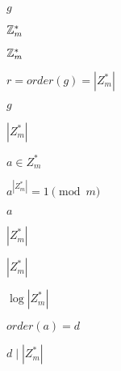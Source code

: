 \documentclass[10pt]{book}
\begin{document}
\begin{mdSnippets}
\begin{mdInlineSnippet}[b2f5ff47436671b6e533d8dc3614845d]
$g$\end{mdInlineSnippet}%
\begin{mdInlineSnippet}[6daa2fe972ee4f6c93b3ad933836504c]%
$\mathbb{Z}_m^*$\end{mdInlineSnippet}%
\begin{mdInlineSnippet}[6daa2fe972ee4f6c93b3ad933836504c]%
$\mathbb{Z}_m^*$\end{mdInlineSnippet}%
\begin{mdInlineSnippet}[1b657b12bd8e241f02572403172b26ec]%
$r = order(g) = |Z_m^*|$\end{mdInlineSnippet}%
\begin{mdInlineSnippet}[b2f5ff47436671b6e533d8dc3614845d]%
$g$\end{mdInlineSnippet}%
\begin{mdInlineSnippet}[fd66507b2dd72ded7e6b45358f7c24ff]%
$|Z_m^*|$\end{mdInlineSnippet}%
\begin{mdInlineSnippet}[fc9c4f9ec0c82c25fe7b3386dc936c49]%
$a \in Z_m^*$\end{mdInlineSnippet}%
\begin{mdInlineSnippet}%
$a^{|Z_m^*|} = 1 \pmod m$\end{mdInlineSnippet}%
\begin{mdInlineSnippet}[0cc175b9c0f1b6a831c399e269772661]%
$a$\end{mdInlineSnippet}%
\begin{mdInlineSnippet}[fd66507b2dd72ded7e6b45358f7c24ff]%
$|Z_m^*|$\end{mdInlineSnippet}%
\begin{mdInlineSnippet}[fd66507b2dd72ded7e6b45358f7c24ff]%
$|Z_m^*|$\end{mdInlineSnippet}%
\begin{mdInlineSnippet}%
$\log |Z_m^*|$\end{mdInlineSnippet}%
\begin{mdInlineSnippet}[061779df2f16d443397f68f2a532f037]%
$order(a) = d$\end{mdInlineSnippet}%
\begin{mdInlineSnippet}%
$d \mid |Z_m^*|$\end{mdInlineSnippet}%

\end{mdSnippets}
\end{document}
